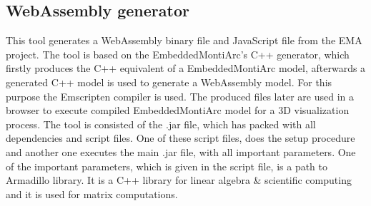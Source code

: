 \subsection{WebAssembly generator} \label{sec:emam2wasm}
This tool generates a WebAssembly binary file and JavaScript file from the EMA project. The tool is based on the EmbeddedMontiArc's C++ generator, which firstly produces the C++ equivalent of a EmbeddedMontiArc model, afterwards a generated C++ model is used to generate a WebAssembly model. For this purpose the Emscripten compiler \cite{Emscripten} is used. The produced files later are used in a browser to execute compiled EmbeddedMontiArc model for a 3D visualization process. \newline
The tool is consisted of the .jar file, which has packed with all dependencies and script files. One of these script files, does the setup procedure and another one executes the main .jar file, with all important parameters. One of the important parameters, which is given in the script file, is a path to Armadillo \cite{Armadillo} library. It is a C++ library for linear algebra \& scientific computing and it is used for matrix computations.

